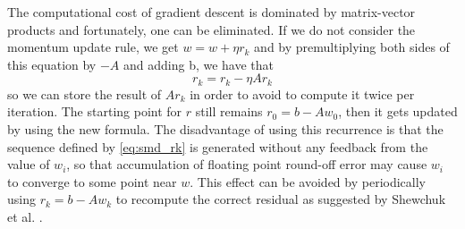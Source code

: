 \noindent The computational cost of gradient descent is dominated by matrix-vector products and fortunately, one can be eliminated. If we do not consider the momentum update rule, we get $w = w + \eta r_k$ and by premultiplying both sides of this equation by $-A$ and adding b, we have that
\begin{equation}
    r_k = r_k - \eta A r_k
    \label{eq:smd_rk}
\end{equation}
so we can store the result of $A r_k$ in order to avoid to compute it twice per iteration. The starting point for $r$ still remains $r_0 = b - A w_0$, then it gets updated by using the new formula. The disadvantage of using this recurrence is that the sequence defined by \eqref{eq:smd_rk} is generated without any feedback from the value of $w_i$, so that accumulation of floating point round-off error may cause $w_i$ to converge to some point near $w$. This effect can be avoided by periodically using $r_k=b-Aw_k$ to recompute the correct residual as suggested by Shewchuk et al. \cite{shewchuk1994introduction}.

